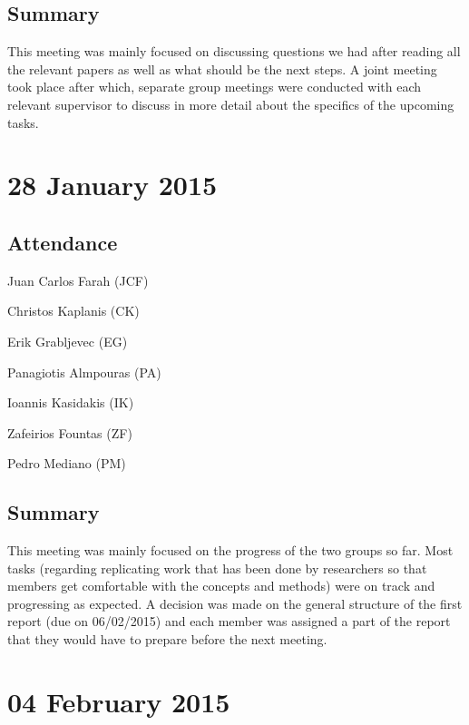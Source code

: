\documentclass[a4paper,11pt]{article}
\begin{document}
\begin{appendices}
\subsection*{Summary}
This meeting was mainly focused on discussing questions we had after reading all the relevant papers as well as what should be the next steps. A joint meeting took place after which, separate group meetings were conducted with each relevant supervisor to discuss in more detail about the specifics of the upcoming tasks.

\maketitle
\section*{28 January 2015}
\subsection*{Attendance}
\begin{compactenum}
\item Juan Carlos Farah (JCF)
\item Christos Kaplanis (CK)
\item Erik Grabljevec (EG)
\item Panagiotis Almpouras (PA)
\item Ioannis Kasidakis (IK)
\item Zafeirios Fountas (ZF)
\item Pedro Mediano (PM)
\end{compactenum}

\subsection*{Summary}
This meeting was mainly focused on the progress of the two groups so far. Most tasks (regarding replicating work that has been done by researchers so that members get comfortable with the concepts and methods) were on track and progressing as expected. A decision was made on the general structure of the first report (due on 06/02/2015) and each member was assigned a part of the report that they would have to prepare before the next meeting.

\maketitle
\section*{04 February 2015}

\end{appendices}
\end{document}

